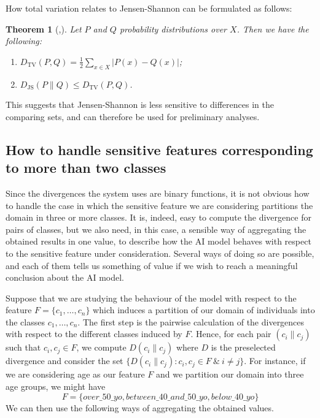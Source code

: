 \documentclass[
]{ceurart}
\newtheorem*{theorem*}{Theorem}
\begin{document}
How total variation relates to Jensen-Shannon can be formulated as follows:

\begin{theorem*}[{\cite[Prop. 4.2]{levin2017markov}},{\cite[Thm. 3]{lin_divergence}}]
Let $P$ and $Q$ probability distributions over $X$. Then we have the following:
\begin{enumerate}
\item $D_{\mathrm{TV}}(P,Q)=\frac{1}{2}\sum_{x\in X}\vert P(x)-Q(x)\vert$;
\vspace{0.2cm}
\item $D_{\mathrm{JS}}(P\parallel Q)\leq D_\mathrm{TV}(P,Q)$.
\vspace{0.2cm}
\end{enumerate}
\end{theorem*}

This suggests that Jensen-Shannon is less sensitive to differences in the comparing sets, and can therefore be used for preliminary analyses.

\subsection{How to handle sensitive features corresponding to more than two classes}\label{subsec:aggregation}

Since the divergences the system uses are binary functions, it is not obvious how to handle the case in which the sensitive feature we are considering partitions the domain in three or more classes. It is, indeed, easy to compute the divergence for pairs of classes, but we also need, in this case, a sensible way of aggregating the obtained results in one value, to describe how the AI model behaves with respect to the sensitive feature under consideration. Several ways of doing so are possible, and each of them tells us something of value if we wish to reach a meaningful conclusion about the AI model.

Suppose that we are studying the behaviour of the model with respect to the feature $F=\{c_1, \ldots , c_n\}$ which induces a partition of our domain of individuals into the classes $c_1, \ldots , c_n$. The first step is the pairwise calculation of the divergences with respect to the different classes induced by $F$. Hence, for each pair $(c_i\parallel c_j)$ such that $c_i, c_j\in F$, we compute $D(c_i\parallel c_j) $ where $D$ is the  preselected divergence and consider the set $\{D(c_i\parallel c_j) : c_i,c_j\in F\ \&\ i\neq j\}$. For instance, if we are considering age as our feature  $F$ and we partition our domain into three age groups, we might have
\[F=\{over\_50\_yo, between\_40\_and\_50\_yo, below\_40\_yo\}\]
We can then use the following ways of aggregating the obtained values.
\end{document}
